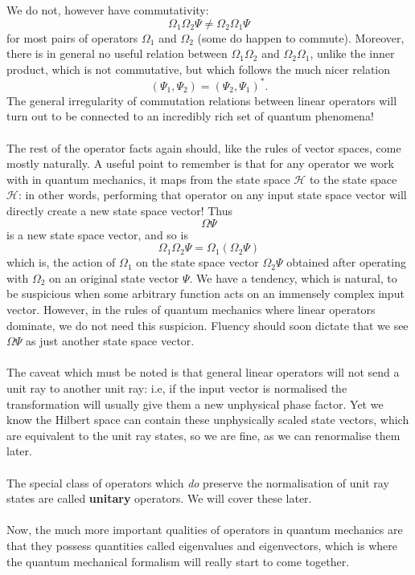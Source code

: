 We do not, however have commutativity:
$$
\Omega_{1}\Omega_{2}\Psi\neq\Omega_{2}\Omega_{1}\Psi
$$
for most pairs of operators $\Omega_{1}$ and $\Omega_{2}$ (some do happen to commute). Moreover, there is in general no useful relation between $\Omega_{1}\Omega_{2}$ and $\Omega_{2}\Omega_{1}$, unlike the inner product, which is not commutative, but which follows the much nicer relation 
$$
(\Psi_{1},\Psi_{2}) = (\Psi_{2},\Psi_{1})^{\ast}.
$$
The general irregularity of commutation relations between linear operators will turn out to be connected to an incredibly rich set of quantum phenomena!
\\\\
The rest of the operator facts again should, like the rules of vector spaces, come mostly naturally. A useful point to remember is that for any operator we work with in quantum mechanics, it maps from the state space $\mathscr{H}$ to the state space $\mathscr{H}$: in other words, performing that operator on any input state space vector will directly create a new state space vector! Thus 
$$
\Omega\Psi
$$
is a new state space vector, and so is
$$
\Omega_{1}\Omega_{2}\Psi=\Omega_{1}(\Omega_{2}\Psi)
$$
which is, the action of $\Omega_{1}$ on the state space vector $\Omega_{2}\Psi$ obtained after operating with $\Omega_{2}$ on an original state vector $\Psi$. We have a tendency, which is natural, to be suspicious when some arbitrary function acts on an immensely complex input vector. However, in the rules of quantum mechanics where linear operators dominate, we do not need this suspicion. Fluency should soon dictate that we see $\Omega\Psi$ as just another state space vector. 
\\\\
The caveat which must be noted is that general linear operators will not send a unit ray to another unit ray: i.e, if the input vector is normalised the transformation will usually give them a new unphysical phase factor. Yet we know the Hilbert space can contain these unphysically scaled state vectors, which are equivalent to the unit ray states, so we are fine, as we can renormalise them later. 
\\\\
The special class of operators which \textit{do} preserve the normalisation of unit ray states are called \textbf{unitary} operators. We will cover these later.
\\\\
Now, the much more important qualities of operators in quantum mechanics are that they possess quantities called eigenvalues and eigenvectors, which is where the quantum mechanical formalism will really start to come together.
